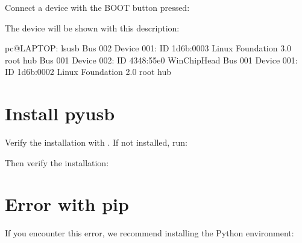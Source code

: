 \documentclass[letterpaper,10pt,english]{sphinxmanual}
\begin{document}
\sphinxAtStartPar
Connect a device with the BOOT button pressed:

\begin{sphinxVerbatim}[commandchars=\\\{\}]
\end{sphinxVerbatim}

\sphinxAtStartPar
The device will be shown with this description:

\begin{sphinxVerbatim}[commandchars=\\\{\}]
pc@LAPTOP:\PYGZti{}\PYGZdl{} lsusb
Bus 002 Device 001: ID 1d6b:0003 Linux Foundation 3.0 root hub
Bus 001 Device 002: ID 4348:55e0 WinChipHead
Bus 001 Device 001: ID 1d6b:0002 Linux Foundation 2.0 root hub
\end{sphinxVerbatim}


\section{Install pyusb}
\label{\detokenize{install_linux:install-pyusb}}
\sphinxAtStartPar
Verify the installation with . If not installed, run:

\begin{sphinxVerbatim}[commandchars=\\\{\}]
   
\end{sphinxVerbatim}

\sphinxAtStartPar
Then verify the installation:

\begin{sphinxVerbatim}[commandchars=\\\{\}]
    
\end{sphinxVerbatim}


\section{Error with pip}
\label{\detokenize{install_linux:error-with-pip}}
\sphinxAtStartPar
If you encounter this error, we recommend installing the Python environment:

\begin{sphinxVerbatim}[commandchars=\\\{\}]
   
\end{sphinxVerbatim}
\end{document}
